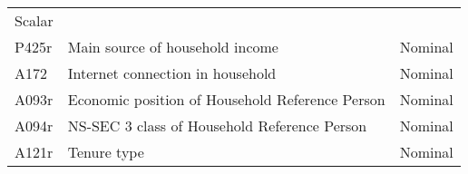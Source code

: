 \documentclass[]{article}
\begin{document}
\begin{longtable}[]{@{}lll@{}}
\begin{minipage}[t]{0.14\columnwidth}
Scalar\strut
\end{minipage}\tabularnewline
\begin{minipage}[t]{0.14\columnwidth}\raggedright
P425r\strut
\end{minipage} & \begin{minipage}[t]{0.64\columnwidth}\raggedright
Main source of household income\strut
\end{minipage} & \begin{minipage}[t]{0.14\columnwidth}\raggedright
Nominal\strut
\end{minipage}\tabularnewline
\begin{minipage}[t]{0.14\columnwidth}\raggedright
A172\strut
\end{minipage} & \begin{minipage}[t]{0.64\columnwidth}\raggedright
Internet connection in household\strut
\end{minipage} & \begin{minipage}[t]{0.14\columnwidth}\raggedright
Nominal\strut
\end{minipage}\tabularnewline
\begin{minipage}[t]{0.14\columnwidth}\raggedright
A093r\strut
\end{minipage} & \begin{minipage}[t]{0.64\columnwidth}\raggedright
Economic position of Household Reference Person\strut
\end{minipage} & \begin{minipage}[t]{0.14\columnwidth}\raggedright
Nominal\strut
\end{minipage}\tabularnewline
\begin{minipage}[t]{0.14\columnwidth}\raggedright
A094r\strut
\end{minipage} & \begin{minipage}[t]{0.64\columnwidth}\raggedright
NS-SEC 3 class of Household Reference Person\strut
\end{minipage} & \begin{minipage}[t]{0.14\columnwidth}\raggedright
Nominal\strut
\end{minipage}\tabularnewline
\begin{minipage}[t]{0.14\columnwidth}\raggedright
A121r\strut
\end{minipage} & \begin{minipage}[t]{0.64\columnwidth}\raggedright
Tenure type\strut
\end{minipage} & \begin{minipage}[t]{0.14\columnwidth}\raggedright
Nominal\strut

\end{minipage}
\end{longtable}
\end{document}
